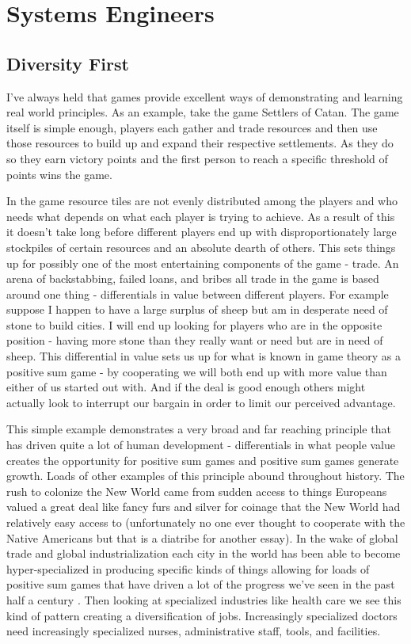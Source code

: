 \documentclass[11pt,a5paper]{book}
\begin{document}
\chapter{Systems Engineers}
\section{Diversity First}
I've always held that games provide excellent ways of demonstrating and learning real world principles. As an example, take the game Settlers of Catan. The game itself is simple enough, players each gather and trade resources and then use those resources to build up and expand their respective settlements. As they do so they earn victory points and the first person to reach a specific threshold of points wins the game. 
\newline

In the game resource tiles are not evenly distributed among the players and who needs what depends on what each player is trying to achieve. As a result of this it doesn't take long before different players end up with disproportionately large stockpiles of certain resources and an absolute dearth of others. This sets things up for possibly one of the most entertaining components of the game - trade. An arena of backstabbing, failed loans, and bribes all trade in the game is based around one thing - differentials in value between different players. For example suppose I happen to have a large surplus of sheep but am in desperate need of stone to build cities. I will end up looking for players who are in the opposite position - having more stone than they really want or need but are in need of sheep. This differential in value sets us up for what is known in game theory as a positive sum game - by cooperating we will both end up with more value than either of us started out with. And if the deal is good enough others might actually look to interrupt our bargain in order to limit our perceived advantage. 
\newline

This simple example demonstrates a very broad and far reaching principle that has driven quite a lot of human development - differentials in what people value creates the opportunity for positive sum games and positive sum games generate growth. Loads of other examples of this principle abound throughout history. The rush to colonize the New World came from sudden access to things Europeans valued a great deal like fancy furs and silver for coinage that the New World had relatively easy access to (unfortunately no one ever thought to cooperate with the Native Americans but that is a diatribe for another essay). In the wake of global trade and global industrialization each city in the world has been able to become hyper-specialized in producing specific kinds of things allowing for loads of positive sum games that have driven a lot of the progress we've seen in the past half a century \cite{zeihan}. Then looking at specialized industries like health care we see this kind of pattern creating a diversification of jobs. Increasingly specialized doctors need increasingly specialized nurses, administrative staff, tools, and facilities.
\newline
\end{document}
